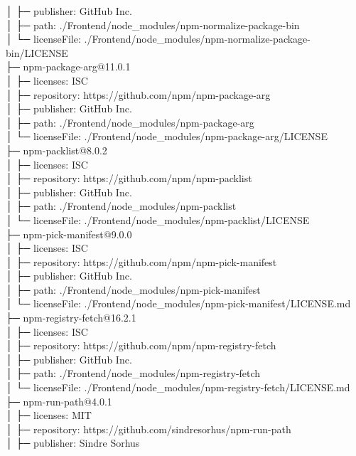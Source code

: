 │  ├─ publisher: GitHub Inc.\\
│  ├─ path: ./Frontend/node\_modules/npm-normalize-package-bin\\
│  └─ licenseFile: ./Frontend/node\_modules/npm-normalize-package-bin/LICENSE\\
├─ npm-package-arg@11.0.1\\
│  ├─ licenses: ISC\\
│  ├─ repository: https://github.com/npm/npm-package-arg\\
│  ├─ publisher: GitHub Inc.\\
│  ├─ path: ./Frontend/node\_modules/npm-package-arg\\
│  └─ licenseFile: ./Frontend/node\_modules/npm-package-arg/LICENSE\\
├─ npm-packlist@8.0.2\\
│  ├─ licenses: ISC\\
│  ├─ repository: https://github.com/npm/npm-packlist\\
│  ├─ publisher: GitHub Inc.\\
│  ├─ path: ./Frontend/node\_modules/npm-packlist\\
│  └─ licenseFile: ./Frontend/node\_modules/npm-packlist/LICENSE\\
├─ npm-pick-manifest@9.0.0\\
│  ├─ licenses: ISC\\
│  ├─ repository: https://github.com/npm/npm-pick-manifest\\
│  ├─ publisher: GitHub Inc.\\
│  ├─ path: ./Frontend/node\_modules/npm-pick-manifest\\
│  └─ licenseFile: ./Frontend/node\_modules/npm-pick-manifest/LICENSE.md\\
├─ npm-registry-fetch@16.2.1\\
│  ├─ licenses: ISC\\
│  ├─ repository: https://github.com/npm/npm-registry-fetch\\
│  ├─ publisher: GitHub Inc.\\
│  ├─ path: ./Frontend/node\_modules/npm-registry-fetch\\
│  └─ licenseFile: ./Frontend/node\_modules/npm-registry-fetch/LICENSE.md\\
├─ npm-run-path@4.0.1\\
│  ├─ licenses: MIT\\
│  ├─ repository: https://github.com/sindresorhus/npm-run-path\\
│  ├─ publisher: Sindre Sorhus\\
